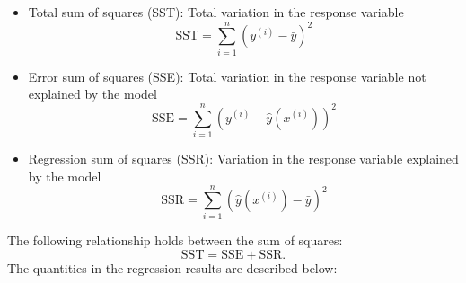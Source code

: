 \documentclass{article}
\begin{document}
\begin{itemize}
    \item Total sum of squares (SST): Total variation in the response
          variable
          \begin{equation*}
              \mathrm{SST} = \sum_{i = 1}^n {\left( y^{\left( i \right)} - \bar{y} \right)}^2
          \end{equation*}
    \item Error sum of squares (SSE): Total variation in the response
          variable not explained by the model
          \begin{equation*}
              \mathrm{SSE} = \sum_{i = 1}^n {\left( y^{\left( i \right)} - \hat{y}\left( x^{\left( i \right)} \right) \right)}^2
          \end{equation*}
    \item Regression sum of squares (SSR): Variation in the response
          variable explained by the model
          \begin{equation*}
              \mathrm{SSR} = \sum_{i = 1}^n {\left( \hat{y}\left( x^{\left( i \right)} \right) - \bar{y} \right)}^2
          \end{equation*}
\end{itemize}
The following relationship holds between the sum of squares:
\begin{equation*}
    \mathrm{SST} = \mathrm{SSE} + \mathrm{SSR}.
\end{equation*}
The quantities in the regression results are described below:
\end{document}
